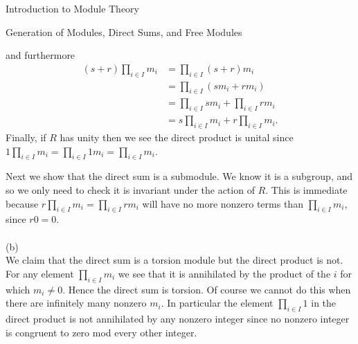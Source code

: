 \begin{chapter}{Introduction to Module Theory}
\begin{section}{Generation of Modules, Direct Sums, and Free Modules}
\begin{solution}
\[\]
and furthermore\begin{align*}
(s+r)\prod_{i\in I}m_i &= \prod_{i\in I}(s+r)m_i\\
& = \prod_{i\in I}(sm_i+rm_i)\\
& = \prod_{i\in I}sm_i + \prod_{i\in I}rm_i\\
& = s\prod_{i\in I}m_i + r\prod_{i\in I}m_i.
\end{align*}
Finally, if $R$ has unity then we see the direct product is unital since $1\prod_{i\in I}m_i = \prod_{i\in I} 1m_i = \prod_{i\in I} m_i$.

Next we show that the direct sum is a submodule. We know it is a subgroup, and so we only need to check it is invariant under the action of $R$. This is immediate because $r\prod_{i\in I}m_i = \prod_{i\in I}rm_i$ will have no more nonzero terms than $\prod_{i\in I}m_i$, since $r0 = 0$. \\\\
(b)\\
We claim that the direct sum is a torsion module but the direct product is not. For any element $\prod_{i\in I}m_i$ we see that it is annihilated by the product of the $i$ for which $m_i\neq 0$. Hence the direct sum is torsion.  Of course we cannot do this when there are infinitely many nonzero $m_i$. In particular the element $\prod_{i\in I} 1$ in the direct product is not annihilated by any nonzero integer since no nonzero integer is congruent to zero mod every other integer. 
\end{solution}\oneperpage




\end{section}
\end{chapter}
